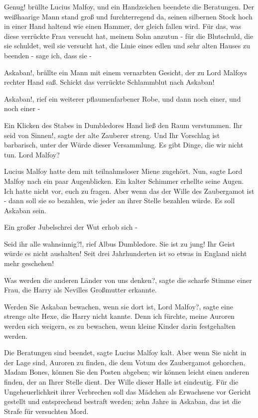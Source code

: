 \glqq Genug!\grqq{} brüllte Lucius Malfoy, und ein Handzeichen beendete die
Beratungen. Der weißhaarige Mann stand groß und furchterregend da, seinen
silbernen Stock hoch in einer Hand haltend wie einen Hammer, der gleich fallen
wird. \glqq Für das, was diese verrückte Frau versucht hat, meinem Sohn anzutun
- für die Blutschuld, die sie schuldet, weil sie versucht hat, die Linie eines
edlen und sehr alten Hauses zu beenden - sage ich, dass sie -\grqq{}

\glqq Askaban!\grqq{}, brüllte ein Mann mit einem vernarbten Gesicht, der zu
Lord Malfoys rechter Hand saß. \glqq Schickt das verrückte Schlammblut nach
Askaban!\grqq{}

\glqq Askaban!\grqq{}, rief ein weiterer pflaumenfarbener Robe, und dann noch
einer, und noch einer -

Ein Klicken des Stabes in Dumbledores Hand ließ den Raum verstummen. \glqq Ihr
seid von Sinnen!\grqq{}, sagte der alte Zauberer streng. \glqq Und Ihr Vorschlag
ist barbarisch, unter der Würde dieser Versammlung. Es gibt Dinge, die wir nicht
tun. Lord Malfoy?\grqq{}

Lucius Malfoy hatte dem mit teilnahmsloser Miene zugehört. \glqq Nun\grqq{},
sagte Lord Malfoy nach ein paar Augenblicken. Ein kalter Schimmer erhellte seine
Augen. \glqq Ich hatte nicht vor, euch zu fragen. Aber wenn das der Wille des
Zaubergamot ist - dann soll sie so bezahlen, wie jeder an ihrer Stelle bezahlen
würde. Es soll Askaban sein.\grqq{}

Ein großer Jubelschrei der Wut erhob sich -

\glqq Seid ihr alle wahnsinnig?!\grqq{}, rief Albus Dumbledore. \glqq Sie ist zu
jung! Ihr Geist würde es nicht aushalten! Seit drei Jahrhunderten ist so etwas
in England nicht mehr geschehen!\grqq{}

\glqq Was werden die anderen Länder von uns denken?\grqq{}, sagte die scharfe
Stimme einer Frau, die Harry als Nevilles Großmutter erkannte.

\glqq Werden Sie Askaban bewachen, wenn sie dort ist, Lord Malfoy?\grqq{}, sagte
eine strenge alte Hexe, die Harry nicht kannte. \glqq Denn ich fürchte, meine
Auroren werden sich weigern, es zu bewachen, wenn kleine Kinder darin
festgehalten werden.\grqq{}

\glqq Die Beratungen sind beendet\grqq{}, sagte Lucius Malfoy kalt. \glqq Aber
wenn Sie nicht in der Lage sind, Auroren zu finden, die dem Votum des
Zaubergamot gehorchen, Madam Bones, können Sie den Posten abgeben; wir können
leicht einen anderen finden, der an Ihrer Stelle dient. Der Wille dieser Halle
ist eindeutig. Für die Ungeheuerlichkeit ihrer Verbrechen soll das Mädchen als
Erwachsene vor Gericht gestellt und entsprechend bestraft werden; zehn Jahre in
Askaban, das ist die Strafe für versuchten Mord.\grqq{}

